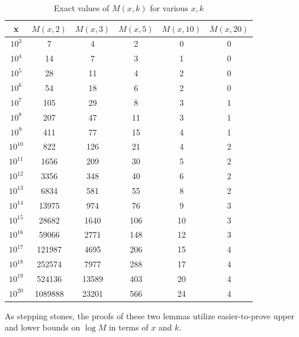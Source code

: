 \documentclass[11pt]{amsart}
\numberwithin{equation}{section}
\numberwithin{algorithm}{section}
\begin{document}
\begin{table}[ht]
\centering
 \begin{tabular}{|c |c |c| c| c| c|} 
 \hline
 x & $M(x,2)$ & $M(x,3)$ & $M(x,5)$ & $M(x,10)$ & $M(x,20)$\\ [0.5ex] 
 \hline
 $10^{3}$  & 7 & 4 & 2 & 0 & 0 \\
 $10^{4}$  & 14 & 7 & 3 & 1 & 0 \\
 $10^{5}$  & 28 & 11 & 4 & 2 & 0 \\
 $10^{6}$  & 54 & 18 & 6 & 2 & 0 \\
 $10^{7}$  & 105 & 29 & 8 & 3 & 1 \\
 $10^{8}$  & 207 & 47 & 11 & 3 & 1 \\
 $10^{9}$  & 411 & 77 & 15 & 4 & 1 \\
 $10^{10}$ & 822 & 126 & 21 & 4 & 2 \\
 $10^{11}$ & 1656 & 209 & 30 & 5 & 2 \\
 $10^{12}$ & 3356 & 348 & 40 & 6 & 2 \\
 $10^{13}$ & 6834 & 581 & 55 & 8 & 2 \\
 $10^{14}$ & 13975 & 974 & 76 & 9 & 3 \\
 $10^{15}$ & 28682 & 1640 & 106 & 10 & 3 \\
 $10^{16}$ & 59066 & 2771 & 148 & 12 & 3 \\
 $10^{17}$ & 121987 & 4695 & 206 & 15 & 4 \\
 $10^{18}$ & 252574 & 7977 & 288 & 17 & 4 \\
 $10^{19}$ & 524136 & 13589 & 403 & 20 & 4 \\
 $10^{20}$ & 1089888 & 23201 & 566 & 24 & 4 \\
 \hline
 \end{tabular}
 \caption{Exact values of $M(x,k)$ for various $x,k$}
\label{table:1}
\end{table}


As stepping stones, 
the proofs of these two lemmas utilize easier-to-prove
upper and lower
bounds on $\log M$ in terms of $x$ and $k$.
\end{document}
